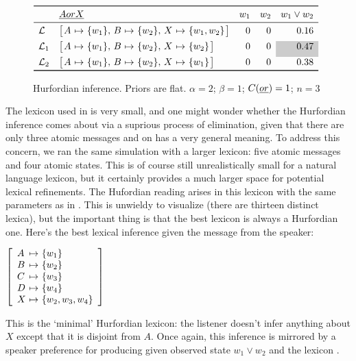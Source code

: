 \documentclass{article}
\begin{document}
\begin{figure}[tp]
  \centering
  $\begin{array}[c]{l l r r r}
    \toprule
     & \word{A or X}       & w_{1} & w_{2} & w_{1} \vee w_{2} \\
    \midrule
    \Lex    & \smallhurfordlex{w_{1}}{w_{2}}{w_{1}, w_{2}} & 0 & 0 & 0.16 \\[1ex]
    \Lex_{1} & \smallhurfordlex{w_{1}}{w_{2}}{w_{2}} & 0 & 0 & \graycell{0.47} \\[1ex]
    \Lex_{2} & \smallhurfordlex{w_{1}}{w_{2}}{w_{1}} & 0 & 0 & 0.38 \\
    \bottomrule
  \end{array}$
  \caption{Hurfordian inference.
    Priors are flat. 
    $\alpha = 2$; 
    $\beta = 1$; 
    $C(\emph{or}) = 1$; 
    $n = 3$}
  \label{fig:hurford}
\end{figure}

The lexicon used in  is very small, and one might
wonder whether the Hurfordian inference comes about via a suprious
process of elimination, given that there are only three atomic
messages and on has a very general meaning. To address this concern,
we ran the same simulation with a larger lexicon: five atomic messages
and four atomic states. This is of course still unrealistically small
for a natural language lexicon, but it certainly provides a much
larger space for potential lexical refinements. The Hufordian reading
arises in this lexicon with the same parameters as in
. This is unwieldy to visualize (there are
thirteen distinct lexica), but the important thing is that the best
lexicon is always a Hurfordian one. Here's the best lexical inference
given the message  from the speaker:
 
\begin{examples}
\item\label{hurford-lex-large}  
  $\left[
    \begin{array}[c]{l@{ \ \mapsto \ }l}
      A & \set{w_{1}} \\
      B & \set{w_{2}} \\
      C & \set{w_{3}} \\
      D & \set{w_{4}} \\
      X & \set{w_{2}, w_{3}, w_{4}}
    \end{array}
  \right]$
\end{examples}
%
This is the `minimal' Hurfordian lexicon: the listener doesn't infer
anything about $X$ except that it is disjoint from $A$. Once again,
this inference is mirrored by a speaker preference for producing
 given observed state $w_{1} \vee w_{2}$ and the lexicon
.
\end{document}
